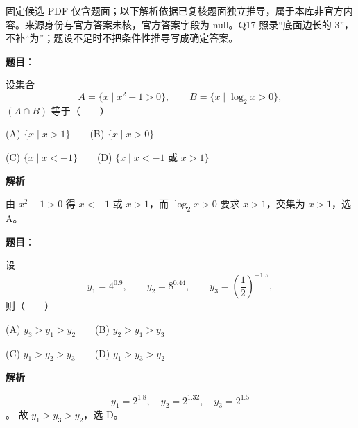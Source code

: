 

\begin{gktip}
固定候选 PDF 仅含题面；以下解析依据已复核题面独立推导，属于本库非官方内容。来源身份与官方答案未核，官方答案字段为 null。Q17 照录“底面边长的 3”，不补“为”；题设不足时不把条件性推导写成确定答案。
\end{gktip}


\begin{answer}

\textbf{题目}：

设集合
\nopagebreak[4]
\[
   A=\{x\mid x^2-1>0\},\qquad B=\{x\mid \log_2x>0\},
\]
   \((A\cap B)\) 等于\mbox{（　　）}

   (A) \(\{x\mid x>1\}\)　　(B) \(\{x\mid x>0\}\)

   (C) \(\{x\mid x<-1\}\)　　(D) \(\{x\mid x<-1\text{ 或 }x>1\}\)

\textbf{解析}

由 \(x^2-1>0\) 得 \(x<-1\) 或 \(x>1\)，而 \(\log_2x>0\) 要求 \(x>1\)，交集为 \(x>1\)，选 A。


\end{answer}
\begin{answer}

\textbf{题目}：

设
\nopagebreak[4]
\[
   y_1=4^{0.9},\qquad y_2=8^{0.44},\qquad y_3=\left(\frac12\right)^{-1.5},
\]
   则\mbox{（　　）}

   (A) \(y_3>y_1>y_2\)　　(B) \(y_2>y_1>y_3\)

   (C) \(y_1>y_2>y_3\)　　(D) \(y_1>y_3>y_2\)

\textbf{解析}

\nopagebreak[4]
\[
y_1=2^{1.8},\quad y_2=2^{1.32},\quad y_3=2^{1.5}
\]
。
故 \(y_1>y_3>y_2\)，选 D。


\end{answer}
